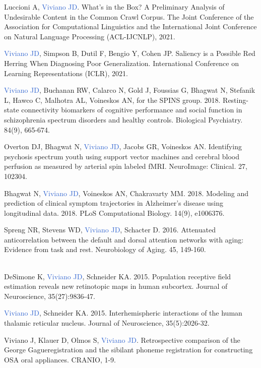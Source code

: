 \documentclass[a4paper,11pt,oneside]{book}
\newcommand\paper[1]{
    #1\\
    \vspace{4.5mm}
}
\begin{document}
\begin{flushleft}
\paper{Luccioni A, \textcolor{highlight}{Viviano JD}. What’s in the Box? A Preliminary Analysis of Undesirable Content in the Common Crawl Corpus. The Joint Conference of the Association for Computational Linguistics and the International Joint Conference on Natural Language Processing (ACL-IJCNLP), 2021.}

\paper{\textcolor{highlight}{Viviano JD}, Simpson B, Dutil F, Bengio Y, Cohen JP. Saliency is a Possible Red Herring When Diagnosing Poor Generalization. International Conference on Learning Representations (ICLR), 2021.}

\paper{\textcolor{highlight}{Viviano JD}, Buchanan RW, Calarco N, Gold J, Foussias G, Bhagwat N, Stefanik L, Hawco C, Malhotra AL, Voineskos AN, for the SPINS group. 2018. Resting-state connectivity biomarkers of cognitive performance and social function in schizophrenia spectrum disorders and healthy controls. Biological Psychiatry. 84(9), 665-674.}

\paper{Overton DJ, Bhagwat N, \textcolor{highlight}{Viviano JD}, Jacobs GR, Voineskos AN. Identifying psychosis spectrum youth using support vector machines and cerebral blood perfusion as measured by arterial spin labeled fMRI. NeuroImage: Clinical. 27, 102304.}

\paper{Bhagwat N, \textcolor{highlight}{Viviano JD}, Voineskos AN, Chakravarty MM. 2018. Modeling and prediction of clinical symptom trajectories in Alzheimer's disease using longitudinal data. 2018. PLoS Computational Biology. 14(9), e1006376.}

Spreng NR, Stevens WD, \textcolor{highlight}{Viviano JD}, Schacter D. 2016. Attenuated anticorrelation between the default and dorsal attention networks with aging: Evidence from task and rest. Neurobiology of Aging. 45, 149-160. \\\

\paper{DeSimone K, \textcolor{highlight}{Viviano JD}, Schneider KA. 2015. Population receptive field estimation reveals new retinotopic maps in human subcortex. Journal of Neuroscience, 35(27):9836-47.}

\paper{\textcolor{highlight}{Viviano JD}, Schneider KA. 2015. Interhemispheric interactions of the human thalamic reticular nucleus. Journal of Neuroscience, 35(5):2026-32.}

Viviano J, Klauer D, Olmos S, \textcolor{highlight}{Viviano JD}. Retrospective comparison of the George Gague\texttrademark registration and the sibilant phoneme registration for constructing OSA oral appliances. CRANIO, 1-9. \\\


\end{flushleft}
\end{document}
